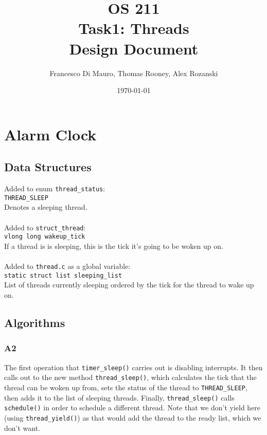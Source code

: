 \documentclass[a4wide, 11pt]{article}
\newcommand{\tab}{\hspace*{2em}}
\begin{document}
\title{OS 211 \\ Task1: Threads \\ Design Document}
\author{Francesco Di Mauro, Thomas Rooney, Alex Rozanski}
\date{\today}
\maketitle


\section{Alarm Clock}
\subsection{Data Structures}

Added to enum \texttt{thread\_status}: \\
\tab \tab \texttt{THREAD\_SLEEP} \\
\tab \tab Denotes a sleeping thread.
\\\\
Added to \texttt{struct\_thread}: \\
\tab\tab \texttt{vlong long wakeup\_tick} \\
\tab\tab If a thread is is sleeping, this is the tick it's going to be woken up on.
\\\\
Added to \texttt{thread.c} as a global variable: \\
\tab\tab \texttt{static struct list sleeping\_list} \\
\tab\tab List of threads currently sleeping ordered by the tick for the thread to wake up on.

\subsection{Algorithms}
\subsubsection{A2}
The first operation that \texttt{timer\_sleep()} carries out is disabling interrupts. It then calls out to the new method \texttt{thread\_sleep()}, which calculates the tick that the thread can be woken up from, sets the status of the thread to \texttt{THREAD\_SLEEP}, then adds it to the list of sleeping threads. Finally, \texttt{thread\_sleep()} calls \texttt{schedule()} in order to schedule a different thread. Note that we don't yield here (using \texttt{thread\_yield()}) as that would add the thread to the ready list, which we don't want.
\end{document}
